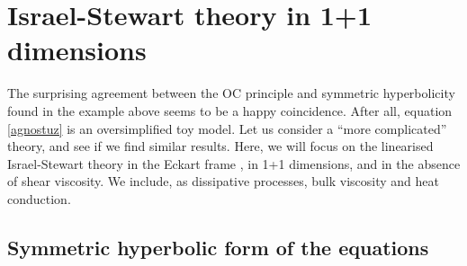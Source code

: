 \documentclass[a4paper, amsfonts, amssymb, amsmath, reprint, showkeys, nofootinbib, twoside, onecolumn,notitlepage]{revtex4-1}
\newcommand{\spc}{\quad \quad \quad}
\begin{document}


\section{Israel-Stewart theory in 1+1 dimensions}\label{IS11}

The surprising agreement between the OC principle and symmetric hyperbolicity found in the example above seems to be a happy coincidence. After all, equation \eqref{agnostuz} is an oversimplified toy model. Let us consider a ``more complicated'' theory, and see if we find similar results. Here, we will focus on the linearised Israel-Stewart theory in the Eckart frame \cite{Israel_Stewart_1979,Hishcock1983}, in 1+1 dimensions, and in the absence of shear viscosity. We include, as dissipative processes, bulk viscosity and heat conduction.

\subsection{Symmetric hyperbolic form of the equations}
\end{document}
